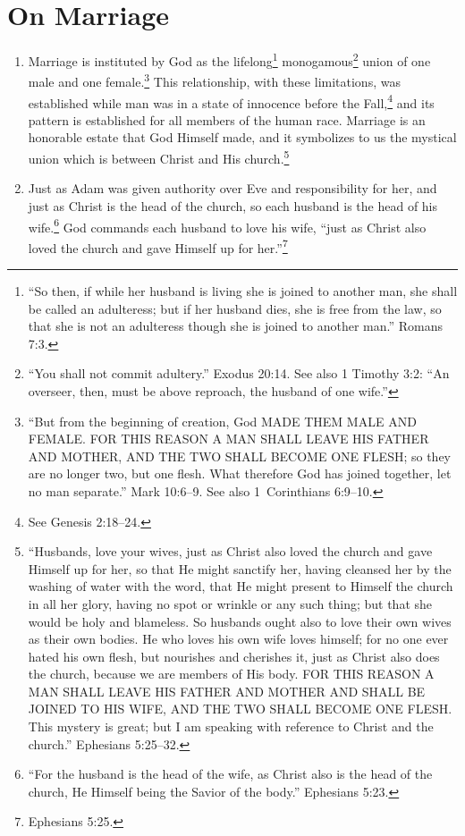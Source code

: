 \documentclass[
]{book}
\begin{document}
\hypertarget{on-marriage}{%
\section*{On Marriage}\label{on-marriage}}

\begin{enumerate}
\def\labelenumi{\arabic{enumi}.}
\setcounter{enumi}{8}
\item
  Marriage is instituted by God as the lifelong\footnote{``So then, if while her husband is living she is joined to another man, she shall be called an adulteress; but if her husband dies, she is free from the law, so that she is not an adulteress though she is joined to another man.'' Romans 7:3.} monogamous\footnote{``You shall not commit adultery.'' Exodus 20:14. See also 1 Timothy 3:2: ``An overseer, then, must be above reproach, the husband of one wife.''} union of one male and one female.\footnote{``But from the beginning of creation, God MADE THEM MALE AND FEMALE. FOR THIS REASON A MAN SHALL LEAVE HIS FATHER AND MOTHER, AND THE TWO SHALL BECOME ONE FLESH; so they are no longer two, but one flesh. What therefore God has joined together, let no man separate.'' Mark 10:6--9. See also 1~Corinthians 6:9--10.} This relationship, with these limitations, was established while man was in a state of innocence before the Fall,\footnote{See Genesis 2:18--24.} and its pattern is established for all members of the human race. Marriage is an honorable estate that God Himself made, and it symbolizes to us the mystical union which is between Christ and His church.\footnote{``Husbands, love your wives, just as Christ also loved the church and gave Himself up for her, so that He might sanctify her, having cleansed her by the washing of water with the word, that He might present to Himself the church in all her glory, having no spot or wrinkle or any such thing; but that she would be holy and blameless. So husbands ought also to love their own wives as their own bodies. He who loves his own wife loves himself; for no one ever hated his own flesh, but nourishes and cherishes it, just as Christ also does the church, because we are members of His body. FOR THIS REASON A MAN SHALL LEAVE HIS FATHER AND MOTHER AND SHALL BE JOINED TO HIS WIFE, AND THE TWO SHALL BECOME ONE FLESH. This mystery is great; but I am speaking with reference to Christ and the church.'' Ephesians 5:25--32.}
\item
  Just as Adam was given authority over Eve and responsibility for her, and just as Christ is the head of the church, so each husband is the head of his wife.\footnote{``For the husband is the head of the wife, as Christ also is the head of the church, He Himself being the Savior of the body.'' Ephesians 5:23.} God commands each husband to love his wife, ``just as Christ also loved the church and gave Himself up for her.''\footnote{Ephesians 5:25.}

\end{enumerate}
\end{document}
